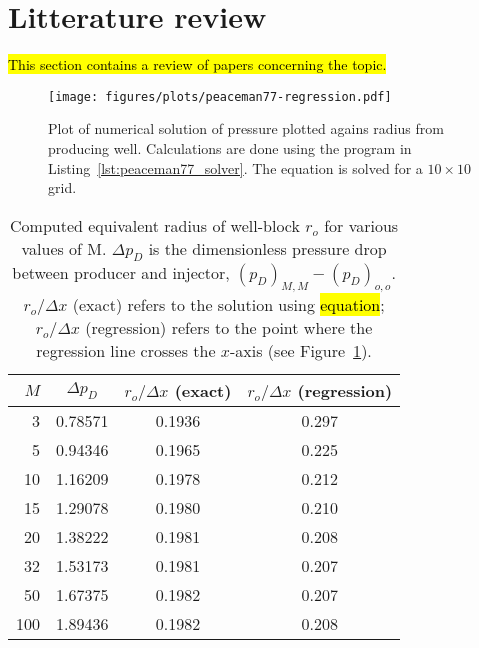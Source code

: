 
\section{Litterature review} %
\label{sec:litterature_review}
\hl{This section contains a review of papers concerning the topic.}

\begin{figure}[htbp]
    \centering
    \texttt{[image: figures/plots/peaceman77-regression.pdf]}
    \caption{Plot of numerical solution of pressure plotted agains radius from producing well. Calculations are done using the program in Listing~\ref{lst:peaceman77_solver}. The equation is solved for a $10\times 10$ grid.}
    \label{fig:peaceman77_pressure_vs_radius}
\end{figure}

\begin{table}
    \centering
    \caption{Computed equivalent radius of well-block $r_o$ for various values of M. $\Delta p_D$ is the dimensionless pressure drop between producer and injector, $(p_D)_{M,M} - (p_D)_{o,o}$. $r_o/\Delta x$ (exact) refers to the solution using \hl{equation}; $r_o / \Delta x$ (regression) refers to the point where the regression line crosses the $x$-axis (see Figure~\ref{fig:peaceman77_pressure_vs_radius}).}
    \begin{tabular}{rccc}
        \toprule
        $M$ & $\Delta p_D$ & $r_o/\Delta x$ (exact) & $r_o / \Delta x$ (regression)\\
        \midrule
        3   & 0.78571 & 0.1936 & 0.297 \\
        5   & 0.94346 & 0.1965 & 0.225 \\
        10  & 1.16209 & 0.1978 & 0.212 \\
        15  & 1.29078 & 0.1980 & 0.210 \\
        20  & 1.38222 & 0.1981 & 0.208 \\
        32  & 1.53173 & 0.1981 & 0.207 \\
        50  & 1.67375 & 0.1982 & 0.207 \\
        100 & 1.89436 & 0.1982 & 0.208 \\
        \bottomrule
    \end{tabular}
    \label{tbl:label}
\end{table}


